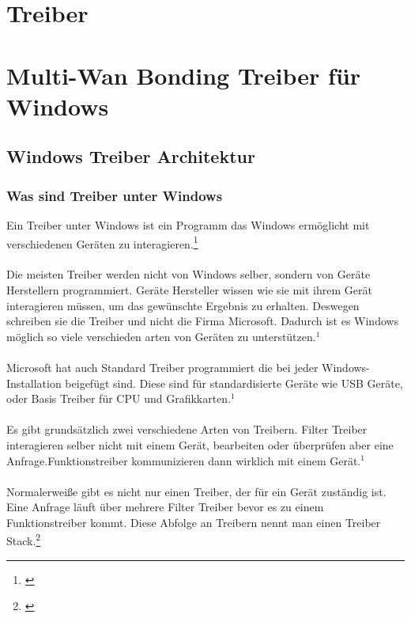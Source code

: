 \chapter{Treiber}
\label{chap:Treiber}
\chapter{Multi-Wan Bonding Treiber für Windows}
\label{chap:Treiber}

\section{Windows Treiber Architektur}
\subsection{Was sind Treiber unter Windows}
Ein Treiber unter Windows ist ein Programm das Windows ermöglicht mit verschiedenen Geräten zu interagieren.\footnote[1]{\cite[Vgl.][]{21}}
\\\\
Die meisten Treiber werden nicht von Windows selber, sondern von Geräte Herstellern programmiert. Geräte Hersteller wissen wie sie mit ihrem Gerät interagieren müssen, um das gewünschte Ergebnis zu erhalten. Deswegen schreiben sie die Treiber und nicht die Firma Microsoft. Dadurch ist es Windows möglich so viele verschieden arten von Geräten zu unterstützen.$^{1}$
\\\\
Microsoft hat auch Standard Treiber programmiert die bei jeder Windows-Installation beigefügt sind. Diese sind für standardisierte Geräte wie USB Geräte, oder Basis Treiber für CPU und Grafikkarten.$^{1}$
\\\\
Es gibt grundsätzlich zwei verschiedene Arten von Treibern. Filter Treiber interagieren selber nicht mit einem Gerät, bearbeiten oder überprüfen aber eine Anfrage.Funktionstreiber kommunizieren dann wirklich mit einem Gerät.$^{1}$
\\\\
Normalerweiße gibt es nicht nur einen Treiber, der für ein Gerät zuständig ist. Eine Anfrage läuft über mehrere Filter Treiber bevor es zu einem Funktionstreiber kommt. Diese Abfolge an Treibern nennt man einen Treiber Stack.\footnote[2]{\cite[Vgl.][]{19}}

